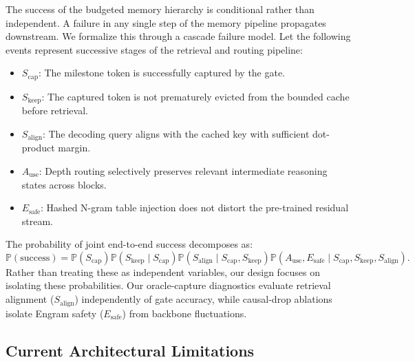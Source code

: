 \documentclass[11pt]{article}
\newcommand{\Prob}{\mathbb{P}}
\begin{document}
The success of the budgeted memory hierarchy is conditional rather than independent. A failure in any single step of the memory pipeline propagates downstream. We formalize this through a cascade failure model. Let the following events represent successive stages of the retrieval and routing pipeline:
\begin{itemize}
    \item $S_{\mathrm{cap}}$: The milestone token is successfully captured by the gate.
    \item $S_{\mathrm{keep}}$: The captured token is not prematurely evicted from the bounded cache before retrieval.
    \item $S_{\mathrm{align}}$: The decoding query aligns with the cached key with sufficient dot-product margin.
    \item $A_{\mathrm{use}}$: Depth routing selectively preserves relevant intermediate reasoning states across blocks.
    \item $E_{\mathrm{safe}}$: Hashed N-gram table injection does not distort the pre-trained residual stream.
\end{itemize}
The probability of joint end-to-end success decomposes as:
\begin{equation}
\label{eq:cascade}
\Prob(\mathrm{success}) = \Prob(S_{\mathrm{cap}}) \Prob(S_{\mathrm{keep}}\mid S_{\mathrm{cap}}) \Prob(S_{\mathrm{align}}\mid S_{\mathrm{cap}},S_{\mathrm{keep}}) \Prob(A_{\mathrm{use}},E_{\mathrm{safe}}\mid S_{\mathrm{cap}},S_{\mathrm{keep}},S_{\mathrm{align}}).
\end{equation}
Rather than treating these as independent variables, our design focuses on isolating these probabilities. Our oracle-capture diagnostics evaluate retrieval alignment ($S_{\mathrm{align}}$) independently of gate accuracy, while causal-drop ablations isolate Engram safety ($E_{\mathrm{safe}}$) from backbone fluctuations.

\subsection{Current Architectural Limitations}
\end{document}
